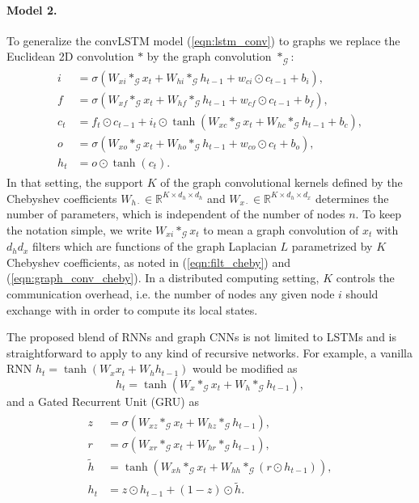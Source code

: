 \documentclass{article} %
\newcommand{\R}{\mathbb{R}}
\newcommand{\G}{\mathcal{G}}
\newcommand{\eqnref}[1]{(\ref{eqn:#1})}
\begin{document}
\paragraph{Model 2.} To generalize the convLSTM model \eqnref{lstm_conv} to
graphs we replace the Euclidean 2D convolution $\ast$ by the graph convolution
$\ast_\G$:
\begin{align} \label{eqn:lstm_graph_v2}
\begin{split}
	i &= \sigma(W_{xi} \ast_\G x_t + W_{hi} \ast_\G h_{t-1} +
	            w_{ci} \odot c_{t-1} + b_i), \\
	f &= \sigma(W_{xf} \ast_\G x_t + W_{hf} \ast_\G h_{t-1} +
	            w_{cf} \odot c_{t-1} + b_f), \\
	c_t &= f_t \odot c_{t-1} + i_t \odot
	       \tanh(W_{xc} \ast_\G x_t + W_{hc} \ast_\G h_{t-1} + b_c), \\
	o &= \sigma(W_{xo} \ast_\G x_t + W_{ho} \ast_\G h_{t-1} +
	            w_{co} \odot c_t + b_o), \\
	h_t &= o \odot \tanh(c_t).
\end{split}
\end{align}
In that setting, the support $K$ of the graph convolutional kernels defined by
the Chebyshev coefficients $W_{h\cdot} \in \R^{K \times d_h \times d_h}$ and
$W_{x\cdot} \in \R^{K \times d_h \times d_x}$ determines the number of
parameters, which is independent of the number of nodes $n$.  To keep the
notation simple, we write $W_{xi} \ast_\G x_t$ to mean a graph convolution of
$x_t$ with $d_h d_x$ filters which are functions of the graph Laplacian $L$
parametrized by $K$ Chebyshev coefficients, as noted in \eqnref{filt_cheby} and
\eqnref{graph_conv_cheby}. In a distributed computing setting, $K$ controls
the communication overhead, i.e. the number of nodes any given node $i$ should
exchange with in order to compute its local states.

The proposed blend of RNNs and graph CNNs is not limited to LSTMs and is
straightforward to apply to any kind of recursive networks. For example, a
vanilla RNN $h_t = \tanh(W_x x_{t} + W_h h_{t-1})$ would be modified as
\begin{equation} \label{eqn:vrnn_graph}
	h_t = \tanh(W_x \ast_\G x_t + W_h \ast_\G h_{t-1}),
\end{equation}
and a Gated Recurrent Unit (GRU) \citep{gru} as
\begin{align} \label{eqn:gru_graph}
\begin{split}
	z &= \sigma(W_{xz} \ast_\G x_t + W_{hz} \ast_\G h_{t-1}), \\
	r &= \sigma(W_{xr} \ast_\G x_t + W_{hr} \ast_\G h_{t-1}), \\
	\tilde{h} &= \tanh(W_{xh} \ast_\G x_t + W_{hh} \ast_\G (r \odot h_{t-1})), \\
	h_t &= z \odot h_{t-1} + (1-z) \odot \tilde{h}.
\end{split}
\end{align}
\end{document}
